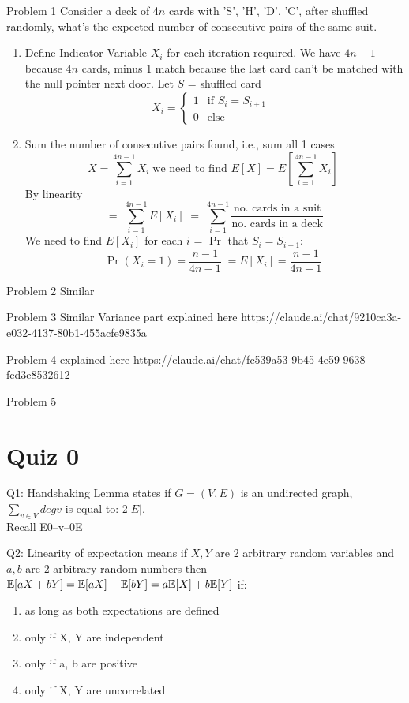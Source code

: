 Problem 1
Consider a deck of 4$n$ cards with 'S', 'H', 'D', 'C', after shuffled randomly, what's the expected number of consecutive pairs of the same suit.
\begin{enumerate}
    \item Define Indicator Variable $X_i$ for each iteration required. We have $4n-1$ because $4n$ cards, minus 1 match because the last card can't be matched with the null pointer next door. Let $S$ = shuffled card
    \[
    X_i =
    \begin{cases} 
    1 & \text{if $S_i = S_{i + 1}$ } \\
    0 & \text{else}
    \end{cases}
    \]
    \item Sum the number of consecutive pairs found, i.e., sum all 1 cases
    \[
        X = \sum_{i=1}^{4n-1} X_i \; \text{we need to find }E[X] = E[\sum_{i=1}^{4n-1} X_i] \;
    \]
    By linearity
    \[
         = \;  \sum_{i=1}^{4n-1} E[X_i] \; = \;  \sum_{i=1}^{4n-1} \frac{\text{no. cards in a suit}}{\text{no. cards in a deck}}
    \]
    We need to find $E[X_i]$ for each $i$ = $\Pr$ that $S_i = S_{i + 1}$:
    \[
        \Pr(X_i = 1) = \frac{n-1}{4n-1} \; = E[X_i] = \frac{n-1}{4n-1}\; 
    \]
\end{enumerate}

Problem 2
Similar

Problem 3
Similar
Variance part explained here https://claude.ai/chat/9210ca3a-e032-4137-80b1-455acfe9835a

Problem 4
explained here https://claude.ai/chat/fc539a53-9b45-4e59-9638-fcd3e8532612 

Problem 5




\section*{Quiz 0}
Q1: Handshaking Lemma states if $G = (V,E)$ is an undirected graph, $\sum_{v \in V}^{} deg v$ is equal to: $2|E|$. \\
Recall E0--v--0E 

Q2: Linearity of expectation means if $X, Y$ are 2 arbitrary random variables and $a, b$ are 2 arbitrary random numbers then $\mathbb{E} [aX + bY] = \mathbb{E}[aX] + \mathbb{E}[bY] = a\mathbb{E}[X] + b\mathbb{E}[Y]$ if:
\begin{enumerate}
    \item as long as both expectations are defined
    \item only if X, Y are independent
    \item only if a, b are positive
    \item only if X, Y are uncorrelated
\end{enumerate}